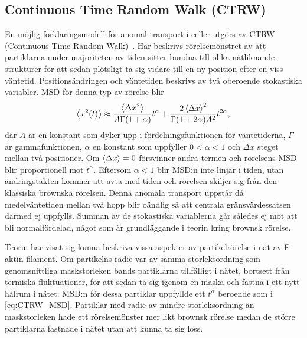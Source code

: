   
\subsection{Continuous Time Random Walk (CTRW)}
En möjlig förklaringsmodell för anomal transport i celler utgörs av CTRW (Continuous-Time Random Walk)~\cite{Hofling&Franosch2013}. Här beskrivs rörelsemönstret av att partiklarna under majoriteten av tiden sitter bundna till olika nätliknande strukturer för att sedan plötsligt ta sig vidare till en ny position efter en viss väntetid. Positionsändringen och väntetiden beskrivs av två oberoende stokastiska variabler. 
MSD för denna typ av rörelse blir\cite{Barkai_CTRW}
\begin{equation}\label{eq:CTRW_MSD}
    \ev{x^2(t)} \approx \frac{\ev{\Delta x^2}}{A \Gamma(1+\alpha)}t^{\alpha} + \frac{2\ev{\Delta x}^2}{\Gamma(1+2\alpha)A^2} t^{2\alpha}, 
\end{equation}
där $A$ är en konstant som dyker upp i fördelningsfunktionen för väntetiderna, $\Gamma$ är gammafunktionen, $\alpha$ en konstant som uppfyller $0<\alpha<1$ och $\Delta x$ steget mellan två positioner. Om $\ev{\Delta x}=0 $ försvinner andra termen och rörelsens MSD blir proportionell mot $t^\alpha$. Eftersom $\alpha < 1$ blir MSD:n inte linjär i tiden, utan ändringstakten kommer att avta med tiden och rörelsen skiljer sig från den klassiska brownska rörelsen.
Denna anomala transport uppstår då medelväntetiden mellan två hopp blir oändlig så att centrala gränsvärdessatsen därmed ej uppfylls. Summan av de stokastiska variablerna går således ej mot att bli normalfördelad, något som är grundläggande i teorin kring brownsk rörelse. 

Teorin har visat sig kunna beskriva vissa aspekter av partikelrörelse i nät av F-aktin filament\cite{Barkai_CTRW}. Om partikelns radie var av samma storleksordning som genomsnittliga maskstorleken bands partiklarna tillfälligt i nätet, bortsett från termiska fluktuationer, för att sedan ta sig igenom en maska och fastna i ett nytt hålrum i nätet. MSD:n för dessa partiklar uppfyllde ett $t^{\alpha}$ beroende som i \eqref{eq:CTRW_MSD}. Partiklar med radie av mindre storleksordning än maskstorleken hade ett rörelsemönster mer likt brownsk rörelse medan de större partiklarna fastnade i nätet utan att kunna ta sig loss.

